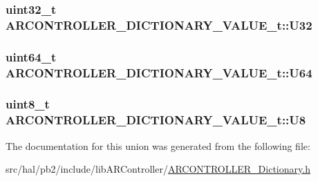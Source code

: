 \subsubsection[{\texorpdfstring{U32}{U32}}]{\setlength{\rightskip}{0pt plus 5cm}uint32\+\_\+t A\+R\+C\+O\+N\+T\+R\+O\+L\+L\+E\+R\+\_\+\+D\+I\+C\+T\+I\+O\+N\+A\+R\+Y\+\_\+\+V\+A\+L\+U\+E\+\_\+t\+::\+U32}\hypertarget{union_a_r_c_o_n_t_r_o_l_l_e_r___d_i_c_t_i_o_n_a_r_y___v_a_l_u_e__t_ab53af0399dd371f5f10608c3cb03a7c0}{}\label{union_a_r_c_o_n_t_r_o_l_l_e_r___d_i_c_t_i_o_n_a_r_y___v_a_l_u_e__t_ab53af0399dd371f5f10608c3cb03a7c0}
\subsubsection[{\texorpdfstring{U64}{U64}}]{\setlength{\rightskip}{0pt plus 5cm}uint64\+\_\+t A\+R\+C\+O\+N\+T\+R\+O\+L\+L\+E\+R\+\_\+\+D\+I\+C\+T\+I\+O\+N\+A\+R\+Y\+\_\+\+V\+A\+L\+U\+E\+\_\+t\+::\+U64}\hypertarget{union_a_r_c_o_n_t_r_o_l_l_e_r___d_i_c_t_i_o_n_a_r_y___v_a_l_u_e__t_a74c8a14f0e2f84f08721b85a99090144}{}\label{union_a_r_c_o_n_t_r_o_l_l_e_r___d_i_c_t_i_o_n_a_r_y___v_a_l_u_e__t_a74c8a14f0e2f84f08721b85a99090144}
\subsubsection[{\texorpdfstring{U8}{U8}}]{\setlength{\rightskip}{0pt plus 5cm}uint8\+\_\+t A\+R\+C\+O\+N\+T\+R\+O\+L\+L\+E\+R\+\_\+\+D\+I\+C\+T\+I\+O\+N\+A\+R\+Y\+\_\+\+V\+A\+L\+U\+E\+\_\+t\+::\+U8}\hypertarget{union_a_r_c_o_n_t_r_o_l_l_e_r___d_i_c_t_i_o_n_a_r_y___v_a_l_u_e__t_a77837ca6f700e7ef779102bd8043e6ab}{}\label{union_a_r_c_o_n_t_r_o_l_l_e_r___d_i_c_t_i_o_n_a_r_y___v_a_l_u_e__t_a77837ca6f700e7ef779102bd8043e6ab}


The documentation for this union was generated from the following file\+:\begin{DoxyCompactItemize}
\item 
src/hal/pb2/include/lib\+A\+R\+Controller/\hyperlink{_a_r_c_o_n_t_r_o_l_l_e_r___dictionary_8h}{A\+R\+C\+O\+N\+T\+R\+O\+L\+L\+E\+R\+\_\+\+Dictionary.\+h}\end{DoxyCompactItemize}
